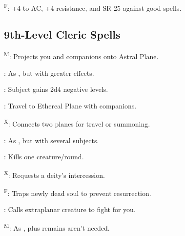 \textsuperscript{F}: +4 to AC, +4 resistance, and SR 25 against good spells.



\subsection{9th-Level Cleric Spells}

\textsuperscript{M}: Projects you and companions onto Astral Plane.

: As , but with greater effects. %

: Subject gains 2d4 negative levels.

: Travel to Ethereal Plane with companions.

\textsuperscript{X}: Connects two planes for travel or summoning.

: As , but with several subjects.

: Kills one creature/round.

\textsuperscript{X}: Requests a deity's intercession.

\textsuperscript{F}: Traps newly dead soul to prevent resurrection.


: Calls extraplanar creature to fight for you.

\textsuperscript{M}: As , plus remains aren't needed.